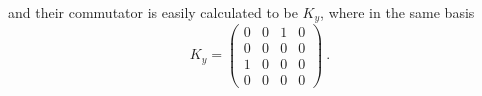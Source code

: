\begin{alphaparts}
    and their commutator is easily calculated to be $K_y$, where in the same
    basis
    \[K_y = \begin{pmatrix}
        0 & 0 & 1 & 0 \\
        0 & 0 & 0 & 0 \\
        1 & 0 & 0 & 0 \\
        0 & 0 & 0 & 0
    \end{pmatrix}~.\]

\end{alphaparts}
